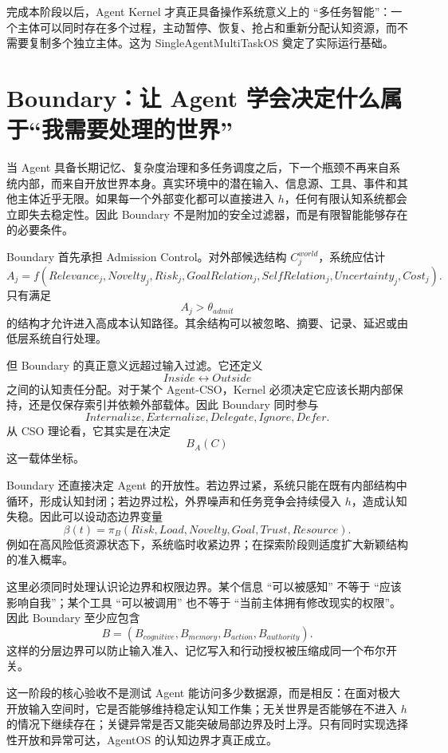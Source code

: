完成本阶段以后，Agent Kernel 才真正具备操作系统意义上的 ``多任务智能''：一个主体可以同时存在多个过程，主动暂停、恢复、抢占和重新分配认知资源，而不需要复制多个独立主体。这为 SingleAgentMultiTaskOS 奠定了实际运行基础。

\section{Boundary：让 Agent 学会决定什么属于“我需要处理的世界”}

当 Agent 具备长期记忆、复杂度治理和多任务调度之后，下一个瓶颈不再来自系统内部，而来自开放世界本身。真实环境中的潜在输入、信息源、工具、事件和其他主体近乎无限。如果每一个外部变化都可以直接进入 $h$，任何有限认知系统都会立即失去稳定性。因此 Boundary 不是附加的安全过滤器，而是有限智能能够存在的必要条件。

Boundary 首先承担 Admission Control。对外部候选结构 $C_j^{world}$，系统应估计
\[
A_j
=
f(
Relevance_j,
Novelty_j,
Risk_j,
GoalRelation_j,
SelfRelation_j,
Uncertainty_j,
Cost_j
).
\]
只有满足
\[
A_j>\theta_{admit}
\]
的结构才允许进入高成本认知路径。其余结构可以被忽略、摘要、记录、延迟或由低层系统自行处理。

但 Boundary 的真正意义远超过输入过滤。它还定义
\[
Inside
\leftrightarrow
Outside
\]
之间的认知责任分配。对于某个 Agent-CSO，Kernel 必须决定它应该长期内部保持，还是仅保存索引并依赖外部载体。因此 Boundary 同时参与
\[
Internalize,
Externalize,
Delegate,
Ignore,
Defer.
\]
从 CSO 理论看，它其实是在决定
\[
B_A(C)
\]
这一载体坐标。

Boundary 还直接决定 Agent 的开放性。若边界过紧，系统只能在既有内部结构中循环，形成认知封闭；若边界过松，外界噪声和任务竞争会持续侵入 $h$，造成认知失稳。因此可以设动态边界变量
\[
\beta(t)
=
\pi_B(
Risk,
Load,
Novelty,
Goal,
Trust,
Resource
).
\]
例如在高风险低资源状态下，系统临时收紧边界；在探索阶段则适度扩大新颖结构的准入概率。

这里必须同时处理认识论边界和权限边界。某个信息 ``可以被感知'' 不等于 ``应该影响自我''；某个工具 ``可以被调用'' 也不等于 ``当前主体拥有修改现实的权限''。因此 Boundary 至少应包含
\[
B=
(B_{cognitive},
B_{memory},
B_{action},
B_{authority}).
\]
这样的分层边界可以防止输入准入、记忆写入和行动授权被压缩成同一个布尔开关。

这一阶段的核心验收不是测试 Agent 能访问多少数据源，而是相反：在面对极大开放输入空间时，它是否能够维持稳定认知工作集；无关世界是否能够在不进入 $h$ 的情况下继续存在；关键异常是否又能突破局部边界及时上浮。只有同时实现选择性开放和异常可达，AgentOS 的认知边界才真正成立。

